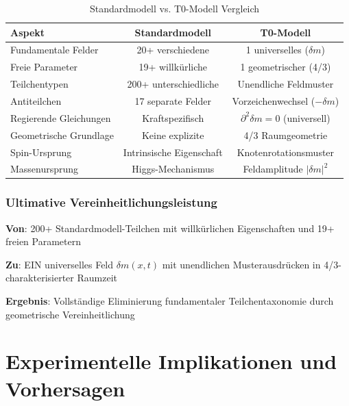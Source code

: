 	\begin{table}[htbp]
		\centering
		\begin{tabular}{lcc}
			\toprule
			\textbf{Aspekt} & \textbf{Standardmodell} & \textbf{T0-Modell} \\
			\midrule
			Fundamentale Felder & 20+ verschiedene & 1 universelles ($\delta m$) \\
			Freie Parameter & 19+ willkürliche & 1 geometrischer (4/3) \\
			Teilchentypen & 200+ unterschiedliche & Unendliche Feldmuster \\
			Antiteilchen & 17 separate Felder & Vorzeichenwechsel ($-\delta m$) \\
			Regierende Gleichungen & Kraftspezifisch & $\partial^2\delta m = 0$ (universell) \\
			Geometrische Grundlage & Keine explizite & 4/3 Raumgeometrie \\
			Spin-Ursprung & Intrinsische Eigenschaft & Knotenrotationsmuster \\
			Massenursprung & Higgs-Mechanismus & Feldamplitude $|\delta m|^2$ \\
			\bottomrule
		\end{tabular}
		\caption{Standardmodell vs. T0-Modell Vergleich}
		\label{tab:detaillierter_vergleich}
	\end{table}
	
	\subsubsection{Ultimative Vereinheitlichungsleistung}
	\label{subsubsec:ultimative_vereinheitlichung}
	
	\begin{tcolorbox}[colback=green!5!white,colframe=green!75!black,title=T0 Vereinheitlichungsleistung]
		\textbf{Von}: 200+ Standardmodell-Teilchen mit willkürlichen Eigenschaften und 19+ freien Parametern
		
		\textbf{Zu}: EIN universelles Feld $\delta m(x,t)$ mit unendlichen Musterausdrücken in 4/3-charakterisierter Raumzeit
		
		\textbf{Ergebnis}: Vollständige Eliminierung fundamentaler Teilchentaxonomie durch geometrische Vereinheitlichung
	\end{tcolorbox}
	
	\section{Experimentelle Implikationen und Vorhersagen}
	\label{sec:experimentelle_implikationen}
	

